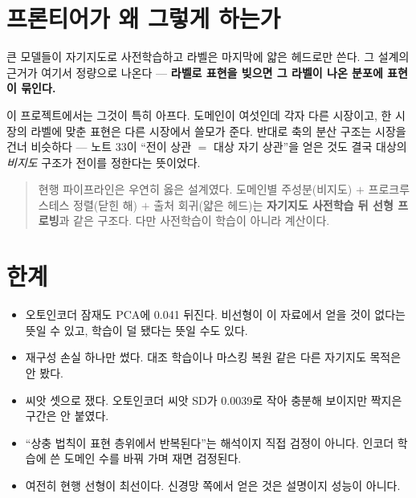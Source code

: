 \documentclass[10pt]{article}
\begin{document}

\section{프론티어가 왜 그렇게 하는가}

큰 모델들이 자기지도로 사전학습하고 라벨은 마지막에 얇은 헤드로만 쓴다.
그 설계의 근거가 여기서 정량으로 나온다 --- \textbf{라벨로 표현을 빚으면 그
라벨이 나온 분포에 표현이 묶인다.}

이 프로젝트에서는 그것이 특히 아프다. 도메인이 여섯인데 각자 다른 시장이고,
한 시장의 라벨에 맞춘 표현은 다른 시장에서 쓸모가 준다. 반대로 축의 분산
구조는 시장을 건너 비슷하다 --- 노트 33이 ``전이 상관 $=$ 대상 자기 상관''을
얻은 것도 결국 대상의 \emph{비지도} 구조가 전이를 정한다는 뜻이었다.

\begin{quote}\fontsize{9.5}{11.5}\selectfont
현행 파이프라인은 우연히 옳은 설계였다. 도메인별 주성분(비지도) $+$ 프로크루스테스
정렬(닫힌 해) $+$ 출처 회귀(얇은 헤드)는 \textbf{자기지도 사전학습 뒤 선형
프로빙}과 같은 구조다. 다만 사전학습이 학습이 아니라 계산이다.
\end{quote}

\section{한계}

\begin{itemize}[leftmargin=1.1em,itemsep=0.15em]
\item 오토인코더 잠재도 PCA에 0.041 뒤진다. 비선형이 이 자료에서 얻을 것이
      없다는 뜻일 수 있고, 학습이 덜 됐다는 뜻일 수도 있다.
\item 재구성 손실 하나만 썼다. 대조 학습이나 마스킹 복원 같은 다른 자기지도
      목적은 안 봤다.
\item 씨앗 셋으로 쟀다. 오토인코더 씨앗 SD가 0.0039로 작아 충분해 보이지만
      짝지은 구간은 안 붙였다.
\item ``상충 법칙이 표현 층위에서 반복된다''는 해석이지 직접 검정이 아니다.
      인코더 학습에 쓴 도메인 수를 바꿔 가며 재면 검정된다.
\item 여전히 현행 선형이 최선이다. 신경망 쪽에서 얻은 것은 설명이지 성능이 아니다.
\end{itemize}
\end{document}
